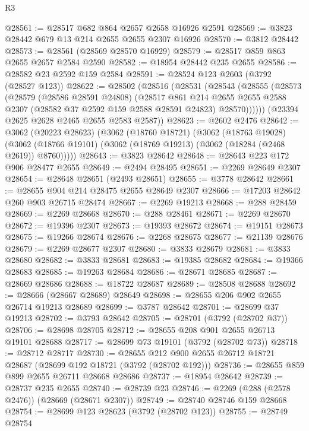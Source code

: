\begin{lexlean}{R3}
\begin{coremodule}
@28561 := @28517 @682 @864 @2657 @2658 @16926 @2591
@28569 := @3823 @28442 @679 @13 @214 @2655 @2655 @2307 @16926
@28570 := @3812 @28442
@28573 := @28561 (@28569 @28570 @16929)
@28579 := @28517 @859 @863 @2655 @2657 @2584 @2590
@28582 := @18954 @28442 @235 @2655
@28586 := @28582 @23 @2592 @159 @2584
@28591 := @28524 @123 @2603 (@3792 (@28527 @123))
@28622 := @28502
    (@28516
      (@28531
        (@28543
          (@28555
            (@28573
              (@28579
                (@28586 @28591 @24808)
                (@28517
                  @861
                  @214
                  @2655
                  @2655
                  @2588
                  @2307
                  (@28582 @37 @2592 @159 @2588 @28591 @24823)
                  @28570))))))
      (@23394 @2625 @2628 @2465 @2655 @2583 @2587))
@28623 := @2602 @2476
@28642 := @3062
    (@20223 @28623)
    (@3062
      (@18760 @18721)
      (@3062
        (@18763 @19028)
        (@3062 (@18766 @19101) (@3062 (@18769 @19213) (@3062 (@18284 (@2468 @2619)) @8760)))))
@28643 := @3823 @28642
@28648 := @28643 @223 @172 @906 @28477 @2655
@28649 := @2494 @28495
@28651 := @2269 @28649 @2307
@28654 := @28648 @28651 (@2493 @28651)
@28655 := @3778 @28642
@28661 := @28655 @904 @214 @28475 @2655 @28649 @2307
@28666 := @17203 @28642 @260 @903 @26715 @28474
@28667 := @2269 @19213
@28668 := @288 @28459
@28669 := @2269 @28668
@28670 := @288 @28461
@28671 := @2269 @28670
@28672 := @19396 @2307
@28673 := @19393 @28672
@28674 := @19151 @28673
@28675 := @19266 @28674
@28676 := @2268 @28675
@28677 := @21139 @28676
@28679 := @2269 @28677 @2307
@28680 := @3833 @28679
@28681 := @3833 @28680
@28682 := @3833 @28681
@28683 := @19385 @28682
@28684 := @19366 @28683
@28685 := @19263 @28684
@28686 := @28671 @28685
@28687 := @28669 @28686
@28688 := @18722 @28687
@28689 := @28508 @28688
@28692 := @28666 (@28667 @28689) @28649
@28698 := @28655 @206 @902 @2655 @26714 @19213 @28689
@28699 := @3787 @28642
@28701 := @28699 @37 @19213
@28702 := @3793 @28642
@28705 := @28701 (@3792 (@28702 @37))
@28706 := @28698 @28705
@28712 := @28655 @208 @901 @2655 @26713 @19101 @28688
@28717 := @28699 @73 @19101 (@3792 (@28702 @73))
@28718 := @28712 @28717
@28730 := @28655 @212 @900 @2655 @26712 @18721 @28687 (@28699 @192 @18721 (@3792 (@28702 @192)))
@28736 := @28655 @859 @899 @2655 @26711 @28668 @28686
@28737 := @18954 @28642
@28739 := @28737 @235 @2655
@28740 := @28739 @23
@28746 := @2269 (@288 (@2578 @2476)) (@28669 (@28671 @2307))
@28749 := @28740 @28746 @159 @28668
@28754 := @28699 @123 @28623 (@3792 (@28702 @123))
@28755 := @28749 @28754

\end{coremodule}
\end{lexlean}
